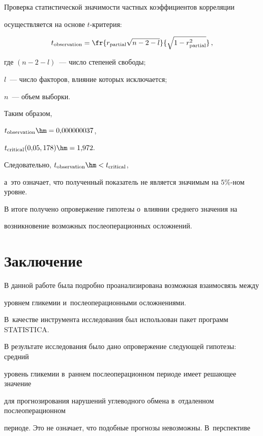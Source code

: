  Проверка статистической значимости частных коэффициентов корреляции

осуществляется на основе $t$-кри\-те\-рия:

$$

t_{\mathrm{observation}}=\fr{r_{\mathrm{partial}}

 \sqrt{n-2-l}}{\sqrt{1-r_{\mathrm{partial}}^2}} \,,

$$

где  $(n - 2 - l)$~--- число степеней свободы;

$l$~--- число факторов, влияние которых исключается;

$n$~--- объем выборки.



Таким образом,

$t_{\mathrm{observation}}\hm= 0{,}000000037$, 

$t_{\mathrm{critical}} (0{,}05, 178)\hm = 1{,}972.$

Следовательно, $t_{\mathrm{observation}} \hm< t_{\mathrm{critical}}$, 

а~это означает, что полученный показатель не является значимым на $5\%$-ном уровне.



В итоге получено опровержение гипотезы о~влиянии среднего значения на 

возникновение возможных послеоперационных осложнений.



\section{Заключение}



В данной работе была подробно проанализирована возможная взаимосвязь между 

уровнем гликемии и~послеоперационными осложнениями. 

В~качестве инструмента исследования был использован пакет программ STATISTICA.



В результате исследования было дано опровержение следующей гипотезы: средний 

уровень гликемии в~раннем послеоперационном периоде имеет ре\-ша\-ющее значение 

для прогнозирования нарушений углеводного обмена в~отдаленном послеоперационном 

периоде. Это не означает, что подобные прогнозы невозможны. В~перспективе 

